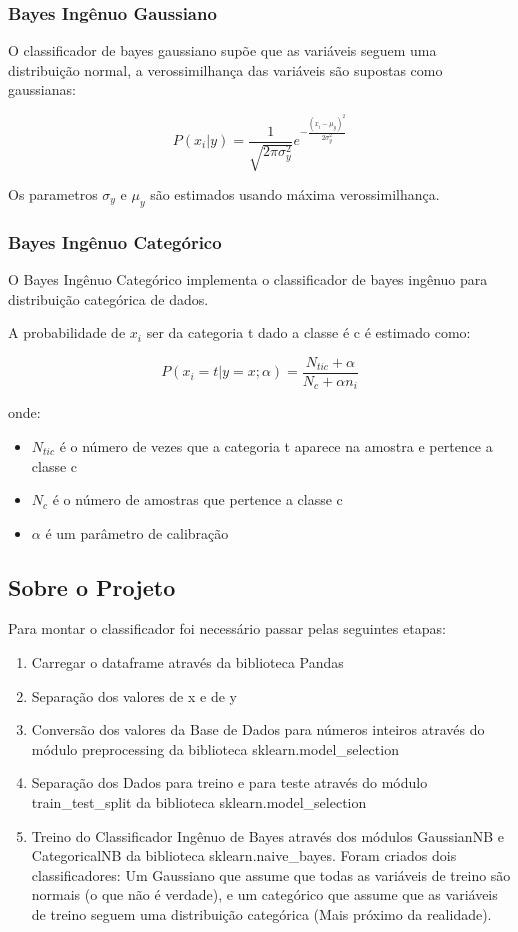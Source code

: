\documentclass[conference]{IEEEtran}
\begin{document}
\subsubsection{Bayes Ingênuo Gaussiano}
O classificador de bayes gaussiano supõe que as variáveis seguem uma distribuição normal, a verossimilhança das variáveis são supostas como gaussianas:

\begin{equation}
    P(x_i|y) = \frac{1}{\sqrt{2\pi\sigma_y^2}}e^{-\frac{(x_i - \mu_y)^2}{2\sigma_y^2}}
\end{equation}

Os parametros $\sigma_y$ e $\mu_y$ são estimados usando máxima verossimilhança.


\subsubsection{Bayes Ingênuo Categórico}
O Bayes Ingênuo Categórico implementa o classificador de bayes ingênuo para distribuição categórica de dados.

A probabilidade de $x_i$ ser da categoria t dado a classe é c é estimado como:

\begin{equation}
    P(x_i = t | y = x; \alpha) = \frac{N_{tic} + \alpha}{N_c + \alpha n_i}
\end{equation}

onde:

\begin{itemize}
\item $N_{tic}$ é o número de vezes que a categoria t aparece na amostra e pertence a classe c
\item $N_c$ é o número de amostras que pertence a classe c
\item $\alpha$ é um parâmetro de calibração
\end{itemize}

\subsection{Sobre o Projeto}
Para montar o classificador foi necessário passar  pelas seguintes etapas:

\begin{enumerate}
\item Carregar o dataframe através da biblioteca Pandas
\item Separação dos valores de x e de y
\item Conversão dos valores da Base de Dados para números inteiros através do módulo preprocessing da biblioteca sklearn.model\_selection
\item Separação dos Dados para treino e para teste através do módulo train\_test\_split da biblioteca sklearn.model\_selection
\item Treino do Classificador Ingênuo de Bayes através dos módulos GaussianNB e CategoricalNB da biblioteca sklearn.naive\_bayes. Foram criados dois classificadores: Um Gaussiano que assume que todas as variáveis de treino são normais (o que não é verdade), e um categórico que assume que as variáveis de treino seguem uma distribuição categórica (Mais próximo da realidade).
\end{enumerate}
\end{document}
